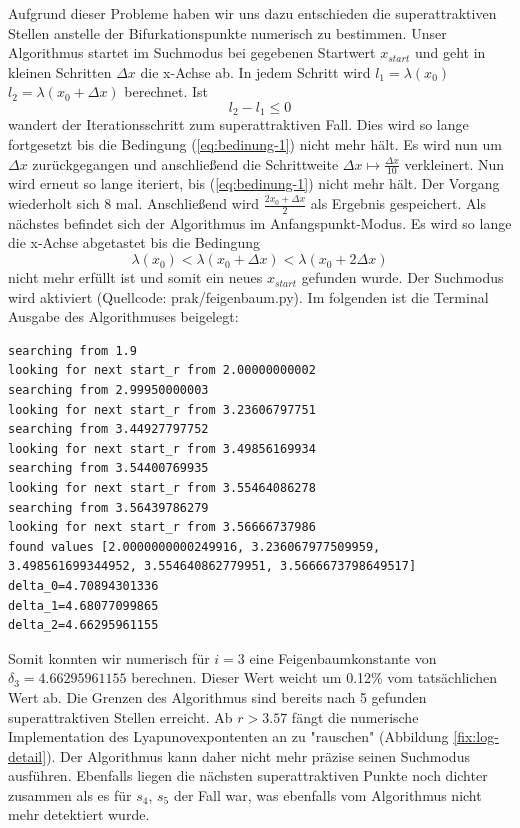 \documentclass[11,5pt, twoside]{article}
\begin{document}
\newline
Aufgrund dieser Probleme
haben wir uns dazu entschieden die superattraktiven Stellen anstelle der Bifurkationspunkte numerisch zu bestimmen. Unser Algorithmus startet im Suchmodus bei gegebenen Startwert $x_{start}$ und geht in kleinen Schritten $\Delta x$ die x-Achse ab. In jedem Schritt wird $l_1=\lambda(x_0)$ $l_2=\lambda(x_0 + \Delta x)$ berechnet. 
Ist
\begin{equation}
l_2-l_1 \leq 0 
\label{eq:bedinung-1}
\end{equation}
wandert der Iterationsschritt zum superattraktiven Fall. 
Dies wird so lange fortgesetzt bis die Bedingung (\ref{eq:bedinung-1}) nicht mehr hält. 
Es wird nun um $\Delta x$ zurückgegangen und anschließend die Schrittweite $\Delta x \mapsto \frac{\Delta x}{10} $ verkleinert. Nun wird erneut so lange iteriert, bis (\ref{eq:bedinung-1}) nicht mehr hält. 
Der Vorgang wiederholt sich 8 mal. Anschließend wird $\frac{2x_0 + \Delta x}{2}$ als Ergebnis gespeichert. 
Als nächstes befindet sich der Algorithmus im Anfangspunkt-Modus. Es wird so lange die x-Achse abgetastet bis die Bedingung 
\begin{equation}
\lambda(x_0) < \lambda(x_0 + \Delta x) < \lambda(x_0 + 2\Delta x)
\end{equation}
nicht mehr erfüllt ist und somit ein neues $x_{start}$ gefunden wurde. Der Suchmodus wird aktiviert  (Quellcode: prak/feigenbaum.py).
Im folgenden ist die Terminal Ausgabe des Algorithmuses beigelegt:
\begin{lstlisting}
searching from 1.9
looking for next start_r from 2.00000000002
searching from 2.99950000003
looking for next start_r from 3.23606797751
searching from 3.44927797752
looking for next start_r from 3.49856169934
searching from 3.54400769935
looking for next start_r from 3.55464086278
searching from 3.56439786279
looking for next start_r from 3.56666737986
found values [2.0000000000249916, 3.236067977509959, 3.498561699344952, 3.554640862779951, 3.5666673798649517]
delta_0=4.70894301336
delta_1=4.68077099865
delta_2=4.66295961155
\end{lstlisting}
Somit konnten wir numerisch für $i=3$ eine Feigenbaumkonstante von $\delta_3=4.66295961155$ berechnen. Dieser Wert weicht um 0.12\% vom tatsächlichen Wert ab. Die Grenzen des Algorithmus sind bereits nach 5 gefunden superattraktiven Stellen erreicht. Ab $r>3.57$ fängt die numerische Implementation des Lyapunovexpontenten an zu "rauschen" (Abbildung \ref{fix:log-detail}). Der Algorithmus kann daher nicht mehr präzise seinen Suchmodus ausführen. Ebenfalls liegen die nächsten superattraktiven Punkte noch dichter zusammen als es für $s_4$, $s_5$ der Fall war, was ebenfalls vom Algorithmus nicht mehr detektiert wurde. 
\end{document}
